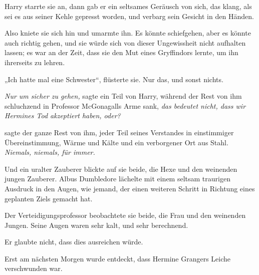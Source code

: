 Harry starrte sie an, dann gab er ein seltsames Geräusch von sich, das klang, als sei es aus seiner Kehle gepresst worden, und verbarg sein Gesicht in den Händen.

Also kniete sie sich hin und umarmte ihn. Es könnte schiefgehen, aber es könnte auch richtig gehen, und sie würde sich von dieser Ungewissheit nicht aufhalten lassen; es war an der Zeit, dass sie den Mut eines Gryffindors lernte, um ihn ihrerseits zu lehren.

„Ich hatte mal eine Schwester“, flüsterte sie. Nur das, und sonst nichts.

\later

\emph{Nur um sicher zu gehen,} sagte ein Teil von Harry, während der Rest von ihm schluchzend in Professor McGonagalls Arme sank, \emph{das bedeutet nicht, dass wir Hermines Tod akzeptiert haben, oder?}

\emph{} sagte der ganze Rest von ihm, jeder Teil seines Verstandes in einstimmiger Übereinstimmung, Wärme und Kälte und ein verborgener Ort aus Stahl.
\emph{Niemals, niemals, für immer.}

\later

Und ein uralter Zauberer blickte auf sie beide, die Hexe und den weinenden jungen Zauberer. Albus Dumbledore lächelte mit einem seltsam traurigen Ausdruck in den Augen, wie jemand, der einen weiteren Schritt in Richtung eines geplanten Ziels gemacht hat.

\later

Der Verteidigungsprofessor beobachtete sie beide, die Frau und den weinenden Jungen. Seine Augen waren sehr kalt, und sehr berechnend.

Er glaubte nicht, dass dies ausreichen würde.

\later

Erst am nächsten Morgen wurde entdeckt, dass Hermine Grangers Leiche verschwunden war.

